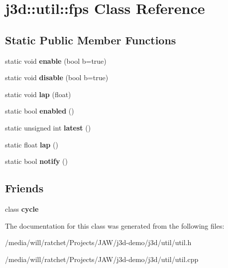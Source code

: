 \hypertarget{classj3d_1_1util_1_1fps}{}\section{j3d\+:\+:util\+:\+:fps Class Reference}
\label{classj3d_1_1util_1_1fps}
\subsection*{Static Public Member Functions}
\begin{DoxyCompactItemize}
\item 
\hypertarget{classj3d_1_1util_1_1fps_a3e6ec087e902a285d8e11dc9e98b08c4}{}static void {\bfseries enable} (bool b=true)\label{classj3d_1_1util_1_1fps_a3e6ec087e902a285d8e11dc9e98b08c4}

\item 
\hypertarget{classj3d_1_1util_1_1fps_a4ff846ef6ca1937a996cb80b71bffd9a}{}static void {\bfseries disable} (bool b=true)\label{classj3d_1_1util_1_1fps_a4ff846ef6ca1937a996cb80b71bffd9a}

\item 
\hypertarget{classj3d_1_1util_1_1fps_a5c8e3452aac20cf37cf05e2c6b862605}{}static void {\bfseries lap} (float)\label{classj3d_1_1util_1_1fps_a5c8e3452aac20cf37cf05e2c6b862605}

\item 
\hypertarget{classj3d_1_1util_1_1fps_a039721c0351b560734e3caab3128739f}{}static bool {\bfseries enabled} ()\label{classj3d_1_1util_1_1fps_a039721c0351b560734e3caab3128739f}

\item 
\hypertarget{classj3d_1_1util_1_1fps_a721fd529d88ece684caed8a3a37426cc}{}static unsigned int {\bfseries latest} ()\label{classj3d_1_1util_1_1fps_a721fd529d88ece684caed8a3a37426cc}

\item 
\hypertarget{classj3d_1_1util_1_1fps_a64311f5e08d4889ccc6b73219fee0101}{}static float {\bfseries lap} ()\label{classj3d_1_1util_1_1fps_a64311f5e08d4889ccc6b73219fee0101}

\item 
\hypertarget{classj3d_1_1util_1_1fps_a2a3a28930241574cf4db318d8ebc7ced}{}static bool {\bfseries notify} ()\label{classj3d_1_1util_1_1fps_a2a3a28930241574cf4db318d8ebc7ced}

\end{DoxyCompactItemize}
\subsection*{Friends}
\begin{DoxyCompactItemize}
\item 
\hypertarget{classj3d_1_1util_1_1fps_ad31738c6e067e2d37a806cefad63155c}{}class {\bfseries cycle}\label{classj3d_1_1util_1_1fps_ad31738c6e067e2d37a806cefad63155c}

\end{DoxyCompactItemize}


The documentation for this class was generated from the following files\+:\begin{DoxyCompactItemize}
\item 
/media/will/ratchet/\+Projects/\+J\+A\+W/j3d-\/demo/j3d/util/util.\+h\item 
/media/will/ratchet/\+Projects/\+J\+A\+W/j3d-\/demo/j3d/util/util.\+cpp\end{DoxyCompactItemize}
